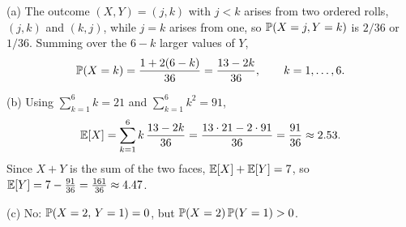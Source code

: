 \begin{solution}
(a) The outcome $(X,Y)=(j,k)$ with $j<k$ arises from two ordered rolls,
$(j,k)$ and $(k,j)$, while $j=k$ arises from one, so $\mathbb{P}(X=j,Y=k)$ is $2/36$ or $1/36$.
Summing over the $6-k$ larger values of $Y$,
\begin{equation*}
  \mathbb{P}(X = k) = \frac{1 + 2(6-k)}{36} = \frac{13-2k}{36},
  \qquad k = 1,\dots,6.
\end{equation*}

(b) Using $\sum_{k=1}^6 k = 21$ and $\sum_{k=1}^6 k^2 = 91$,
\begin{equation*}
  \mathbb{E}[X] = \sum_{k=1}^{6} k\,\frac{13-2k}{36}
        = \frac{13\cdot21 - 2\cdot91}{36} = \frac{91}{36} \approx 2.53.
\end{equation*}
Since $X+Y$ is the sum of the two faces, $\mathbb{E}[X]+\mathbb{E}[Y] = 7$, so
$\mathbb{E}[Y] = 7 - \frac{91}{36} = \frac{161}{36} \approx 4.47$.

(c) No: $\mathbb{P}(X=2,\,Y=1) = 0$, but $\mathbb{P}(X=2)\,\mathbb{P}(Y=1) > 0$.
\end{solution}


